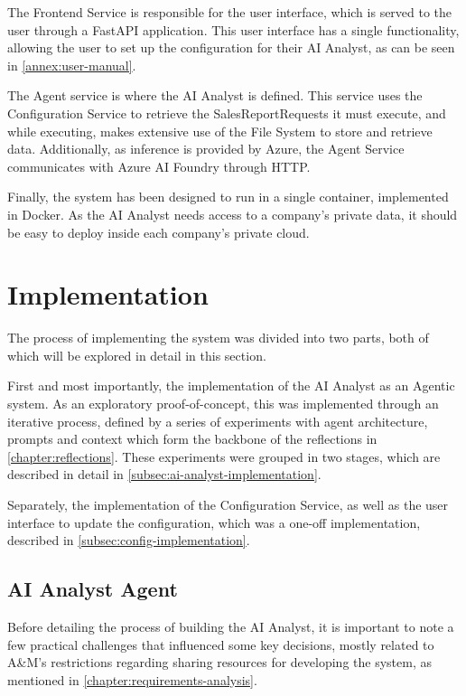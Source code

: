 \documentclass[a4paper]{report}
\begin{document}
The Frontend Service is responsible for the user interface, which is served to the user through a FastAPI application. This user interface has a single functionality, allowing the user to set up the configuration for their AI Analyst, as can be seen in \autoref{annex:user-manual}. 

The Agent service is where the AI Analyst is defined. This service uses the Configuration Service to retrieve the SalesReportRequests it must execute, and while executing, makes extensive use of the File System to store and retrieve data. Additionally, as inference is provided by Azure, the Agent Service communicates with Azure AI Foundry through HTTP.

Finally, the system has been designed to run in a single container, implemented in Docker. As the AI Analyst needs access to a company's private data, it should be easy to deploy inside each company's private cloud.

\section{Implementation}
\label{sec:implementation}

The process of implementing the system was divided into two parts, both of which will be explored in detail in this section.

First and most importantly, the implementation of the AI Analyst as an Agentic system. As an exploratory proof-of-concept, this was implemented through an iterative process, defined by a series of experiments with agent architecture, prompts and context which form the backbone of the reflections in \autoref{chapter:reflections}. These experiments were grouped in two stages, which are described in detail in \autoref{subsec:ai-analyst-implementation}.

Separately, the implementation of the Configuration Service, as well as the user interface to update the configuration, which was a one-off implementation, described in \autoref{subsec:config-implementation}.

\subsection{AI Analyst Agent}
\label{subsec:ai-analyst-implementation}

Before detailing the process of building the AI Analyst, it is important to note a few practical challenges that influenced some key decisions, mostly related to A\&M's restrictions regarding sharing resources for developing the system, as mentioned in \autoref{chapter:requirements-analysis}.
\end{document}
